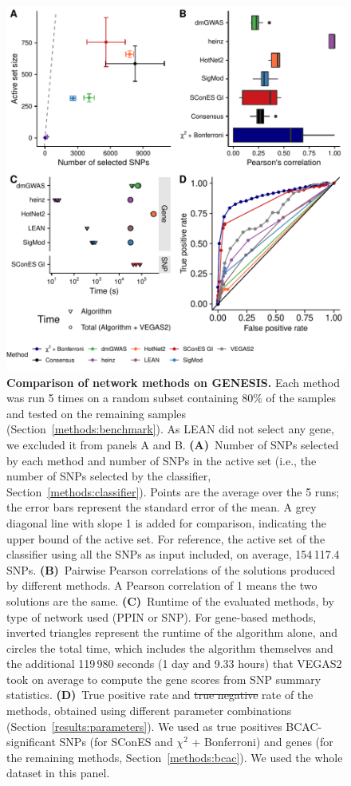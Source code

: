 \documentclass[10pt,letterpaper]{article}
\providecommand{\DIFaddtex}[1]{{\protect\color{blue}\uwave{#1}}} %
\providecommand{\DIFdeltex}[1]{{\protect\color{red}\sout{#1}}}                      %
\providecommand{\DIFaddFL}[1]{\DIFadd{#1}} %
\providecommand{\DIFdelFL}[1]{\DIFdel{#1}} %
\providecommand{\DIFaddbeginFL}{} %
\providecommand{\DIFaddendFL}{} %
\providecommand{\DIFdelbeginFL}{} %
\providecommand{\DIFdelendFL}{} %
\providecommand{\DIFadd}[1]{\texorpdfstring{\DIFaddtex{#1}}{#1}} %
\providecommand{\DIFdel}[1]{\texorpdfstring{\DIFdeltex{#1}}{}} %
\newcommand{\DIFscaledelfig}{0.5}
\newlength{\DIFdelgraphicswidth} %
\newlength{\DIFdelgraphicsheight} %
\newcommand{\DIFaddincludegraphics}[2][]{{\color{blue}\fbox{\DIFOincludegraphics[#1]{#2}}}} %
\newcommand{\DIFdelincludegraphics}[2][]{%
\sbox{\DIFdelgraphicsbox}{\DIFOincludegraphics[#1]{#2}}%
\settoboxwidth{\DIFdelgraphicswidth}{\DIFdelgraphicsbox} %
\settoboxtotalheight{\DIFdelgraphicsheight}{\DIFdelgraphicsbox} %
\scalebox{\DIFscaledelfig}{%
\parbox[b]{\DIFdelgraphicswidth}{\usebox{\DIFdelgraphicsbox}\\[-\baselineskip] \rule{\DIFdelgraphicswidth}{0em}}\llap{\resizebox{\DIFdelgraphicswidth}{\DIFdelgraphicsheight}{%
\setlength{\unitlength}{\DIFdelgraphicswidth}%
\begin{picture}(1,1)%
\thicklines\linethickness{2pt} %
{\color[rgb]{1,0,0}\put(0,0){\framebox(1,1){}}}%
{\color[rgb]{1,0,0}\put(0,0){\line( 1,1){1}}}%
{\color[rgb]{1,0,0}\put(0,1){\line(1,-1){1}}}%
\end{picture}%
}\hspace*{3pt}}} %
} %
\DeclareRobustCommand{\DIFaddbeginFL}{\DIFOaddbeginFL \let\includegraphics\DIFaddincludegraphics} %
\DeclareRobustCommand{\DIFaddendFL}{\DIFOaddendFL \let\includegraphics\DIFOincludegraphics} %
\DeclareRobustCommand{\DIFdelbeginFL}{\DIFOdelbeginFL \let\includegraphics\DIFdelincludegraphics} %
\DeclareRobustCommand{\DIFdelendFL}{\DIFOaddendFL \let\includegraphics\DIFOincludegraphics} %
\begin{document}
\begin{figure}[!ht]
  \centering
  \DIFdelbeginFL %
\DIFdelendFL \DIFaddbeginFL \includegraphics[width=.8\linewidth]{./figures/figure_3.pdf}
  \DIFaddendFL \caption{\textbf{Comparison of network methods on GENESIS.} Each method was run 5 times on a random subset containing 80\% of the samples and tested on the remaining samples (Section~\ref{methods:benchmark}). As LEAN did not select any gene, we excluded it from panels A and B. \textbf{(A)}~Number of SNPs selected by each method and number of SNPs in the active set (i.e., the number of SNPs selected by the classifier, Section~\ref{methods:classifier}). Points are the average over the 5 runs; the error bars represent the standard error of the mean. A grey diagonal line with slope 1 is added for comparison, indicating the upper bound of the active set. For reference, the active set of the classifier using all the SNPs as input included, on average, 154\,117.4 SNPs. \textbf{(B)}~Pairwise Pearson correlations of the solutions produced by different methods. A Pearson correlation of 1 means the two solutions are the same. \textbf{(C)}~Runtime of the evaluated methods, by type of network used (PPIN or SNP). For gene-based methods, inverted triangles represent the runtime of the algorithm alone, and circles the total time, which includes the algorithm themselves and the additional 119\,980 seconds (1 day and 9.33 hours) that VEGAS2 took on average to compute the gene scores from SNP summary statistics. \textbf{(D)}~True positive rate and \DIFdelbeginFL \DIFdelFL{true negative }\DIFdelendFL \DIFaddbeginFL \DIFaddFL{false positive }\DIFaddendFL rate of the methods, obtained using different parameter combinations (Section~\ref{results:parameters}). We used as true positives BCAC-significant SNPs (for SConES and $\chi^2$ + Bonferroni) and genes (for the remaining methods, Section~\ref{methods:bcac}). We used the whole dataset in this panel.}
  \label{fig:benchmark}
  \end{figure}
\end{document}
